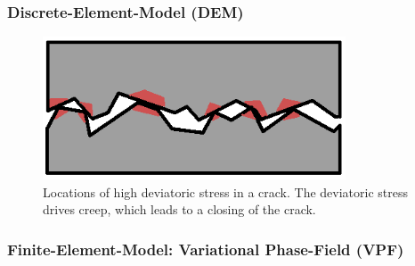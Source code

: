 \subsubsection*{Discrete-Element-Model (DEM)}

\begin{figure}[!ht]
\centering
\includegraphics[width=9cm]{figures/mex3-crack-stresses.png}
\caption{Locations of high deviatoric stress in a crack. The deviatoric stress drives creep, which leads to a closing of the crack.}
\label{fig:ME3-crack-stre}
\end{figure}


\subsubsection*{Finite-Element-Model: Variational Phase-Field (VPF)}

